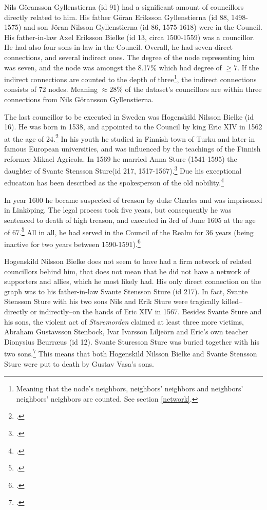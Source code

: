 Nils Göransson Gyllenstierna (id 91) had a significant amount of councillors directly related to him. His father Göran Eriksson Gyllenstierna (id 88, 1498-1575) and son Jöran Nilsson Gyllenstierna (id 86, 1575-1618) were in the Council. His father-in-law Axel Eriksson Bielke (id 13, circa 1500-1559) was a councillor. He had also four sons-in-law in the Council. Overall, he had seven direct connections, and several indirect ones. The degree of the node representing him was seven, and the node was amongst the 8.17\% which had degree of $\geq 7$. If the indirect connections are counted to the depth of three\footnote{Meaning that the node's neighbors, neighbors' neighbors and neighbors' neighbors' neighbors are counted. See section \ref{network}.}, the indirect connections consists of 72 nodes. Meaning $\approx 28 \%$ of the dataset's councillors are within three connections from Nils Göransson Gyllenstierna.

The last councillor to be executed in Sweden was Hogenskild Nilsson Bielke (id 16). He was born in 1538, and appointed to the Council by king Eric XIV in 1562 at the age of 24.\footcites[p. 58.]{HakanenAKoskinen2017}{councillorsDS} In his youth he studied in Finnish town of Turku and later in famous European universities, and was influenced by the teachings of the Finnish reformer Mikael Agricola. In 1569 he married Anna Sture (1541-1595) the daughter of Svante Stensson Sture(id 217, 1517-1567).\footcite{sbl_bielke_hongeskild} Due his exceptional education has been described as the spokesperson of the old nobility.\footcite[p. 55.]{lappalainen09}

In year 1600 he became suspected of treason by duke Charles and was imprisoned in Linköping. The legal process took five years, but consequently he was sentenced to death of high treason, and executed in 3rd of June 1605 at the age of 67.\footcite{sbl_bielke_hongeskild} All in all, he had served in the Council of the Realm for 36 years (being inactive for two years between 1590-1591).\footcite{councillorsDS}

Hogenskild Nilsson Bielke does not seem to have had a firm network of related councillors behind him, that does not mean that he did not have a network of supporters and allies, which he most likely had. His only direct connection on the graph was to his father-in-law Svante Stensson Sture (id 217). In fact, Svante Stensson Sture with his two sons Nils and Erik Sture were tragically killed–directly or indirectly–on the hands of Eric XIV in 1567. Besides Svante Sture and his sons, the violent act of \textit{Sturemorden} claimed at least three more victims, Abraham Gustavsson Stenbock, Ivar Ivarsson Liljeörn and Eric's own teacher Dionysius Beurræus (id 12). Svante Sturesson Sture was buried together with his two sons.\footcite{sbl_svante_sture} This means that both Hogenskild Nilsson Bielke and Svante Stensson Sture were put to death by Gustav Vasa's sons.

